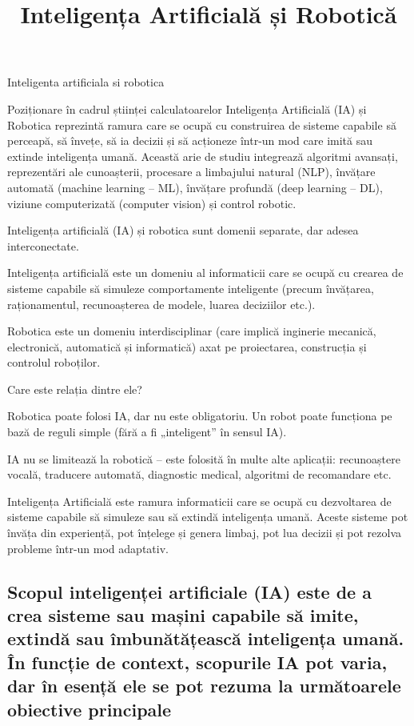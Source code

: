\documentclass[12pt]{article}
\title{Inteligența Artificială și Robotică}
\author{}
\date{}
\begin{document}
\maketitle



Inteligenta artificiala si robotica

Poziționare în cadrul științei calculatoarelor
Inteligența Artificială (IA) și Robotica reprezintă ramura care se ocupă cu construirea de sisteme capabile să perceapă, să învețe, să ia decizii și să acționeze într-un mod care imită sau extinde inteligența umană. Această arie de studiu integrează algoritmi avansați, reprezentări ale cunoașterii, procesare a limbajului natural (NLP), învățare automată (machine learning – ML), învățare profundă (deep learning – DL), viziune computerizată (computer vision) și control robotic.

Inteligența artificială (IA) și robotica sunt domenii separate, dar adesea interconectate.

Inteligența artificială este un domeniu al informaticii care se ocupă cu crearea de sisteme capabile să simuleze comportamente inteligente (precum învățarea, raționamentul, recunoașterea de modele, luarea deciziilor etc.).

Robotica este un domeniu interdisciplinar (care implică inginerie mecanică, electronică, automatică și informatică) axat pe proiectarea, construcția și controlul roboților.

Care este relația dintre ele?

Robotica poate folosi IA, dar nu este obligatoriu. Un robot poate funcționa pe bază de reguli simple (fără a fi „inteligent” în sensul IA).

IA nu se limitează la robotică – este folosită în multe alte aplicații: recunoaștere vocală, traducere automată, diagnostic medical, algoritmi de recomandare etc.

Inteligența Artificială este ramura informaticii care se ocupă cu dezvoltarea de sisteme capabile să simuleze sau să extindă inteligența umană. Aceste sisteme pot învăța din experiență, pot înțelege și genera limbaj, pot lua decizii și pot rezolva probleme într-un mod adaptativ.

\subsection*{Scopul inteligenței artificiale (IA) este de a crea sisteme sau mașini capabile să imite, extindă sau îmbunătățească inteligența umană. În funcție de context, scopurile IA pot varia, dar în esență ele se pot rezuma la următoarele obiective principale}
\end{document}
